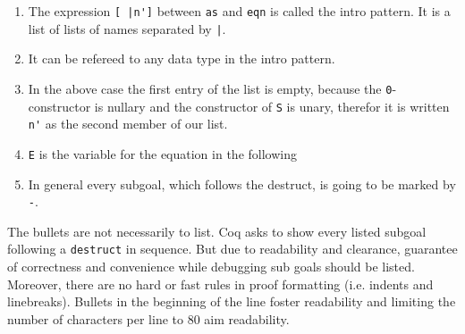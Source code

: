 	\begin{enumerate}
		\item The expression \lstinline![ |n']! between \lstinline!as! and \lstinline!eqn! is called the intro pattern. It is a list of lists of names separated by \lstinline!|!.
		\item It can be refereed to any data type in the intro pattern.
		\item In the above case the first entry of the list is empty, because the \lstinline!0!-constructor is nullary and the constructor of \lstinline!S! is unary, therefor it is written \lstinline!n'! as the second member of our list.
		\item \lstinline!E! is the variable for the equation in the following
		\item In general every subgoal, which follows the destruct, is going to be marked by \lstinline!-!.
	\end{enumerate} 
	The bullets are not necessarily to list. 
	Coq asks to show every listed subgoal following a \lstinline!destruct! in sequence.
	But due to readability and clearance, guarantee of correctness and convenience while debugging sub goals should be listed.\\	
	Moreover, there are no hard or fast rules in proof formatting (i.e. indents and linebreaks). 
	Bullets in the beginning of the line foster readability and limiting the number of characters per line to 80 aim readability.
	
